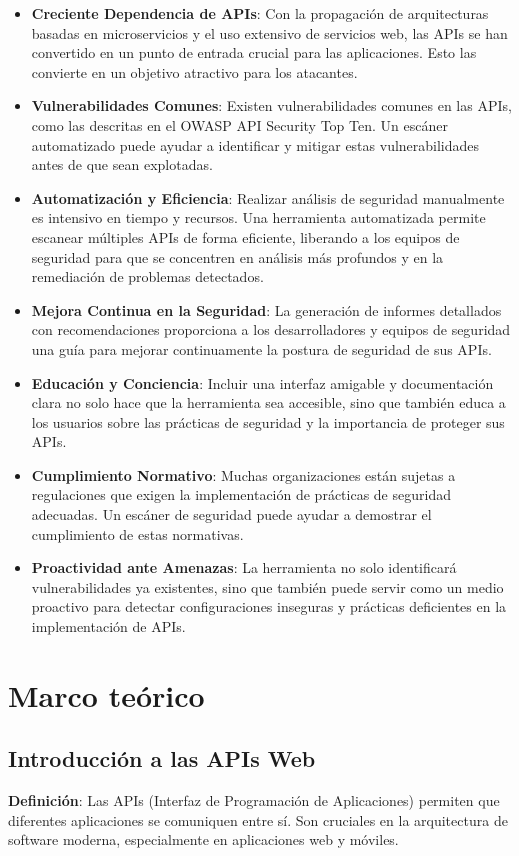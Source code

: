 \documentclass{article}
\begin{document}
    \begin{itemize}
        \item \textbf{Creciente Dependencia de APIs}: Con la propagación de arquitecturas basadas en microservicios y el uso extensivo de servicios web, las APIs se han convertido en un punto de entrada crucial para las aplicaciones. Esto las convierte en un objetivo atractivo para los atacantes.
        \item \textbf{Vulnerabilidades Comunes}: Existen vulnerabilidades comunes en las APIs, como las descritas en el OWASP API Security Top Ten. Un escáner automatizado puede ayudar a identificar y mitigar estas vulnerabilidades antes de que sean explotadas.
        \item \textbf{Automatización y Eficiencia}: Realizar análisis de seguridad manualmente es intensivo en tiempo y recursos. Una herramienta automatizada permite escanear múltiples APIs de forma eficiente, liberando a los equipos de seguridad para que se concentren en análisis más profundos y en la remediación de problemas detectados.
        \item \textbf{Mejora Continua en la Seguridad}: La generación de informes detallados con recomendaciones proporciona a los desarrolladores y equipos de seguridad una guía para mejorar continuamente la postura de seguridad de sus APIs.
        \item \textbf{Educación y Conciencia}: Incluir una interfaz amigable y documentación clara no solo hace que la herramienta sea accesible, sino que también educa a los usuarios sobre las prácticas de seguridad y la importancia de proteger sus APIs.
        \item \textbf{Cumplimiento Normativo}: Muchas organizaciones están sujetas a regulaciones que exigen la implementación de prácticas de seguridad adecuadas. Un escáner de seguridad puede ayudar a demostrar el cumplimiento de estas normativas.
        \item \textbf{Proactividad ante Amenazas}: La herramienta no solo identificará vulnerabilidades ya existentes, sino que también puede servir como un medio proactivo para detectar configuraciones inseguras y prácticas deficientes en la implementación de APIs.
    \end{itemize}

    \section{Marco teórico}

    \subsection{Introducción a las APIs Web}
    \textbf{Definición}: Las APIs (Interfaz de Programación de Aplicaciones) permiten que diferentes aplicaciones se comuniquen entre sí. Son cruciales en la arquitectura de software moderna, especialmente en aplicaciones web y móviles.
\end{document}
